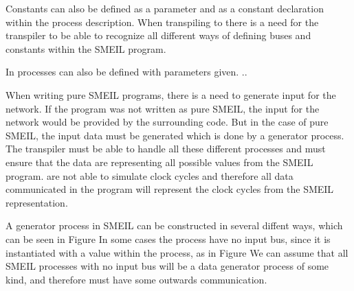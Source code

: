 Constants can also be defined as a parameter and as a constant declaration within the process description. %
When transpiling to \cspm there is a need for the transpiler to be able to recognize all different ways of defining buses and constants within the SMEIL program.


In \cspm{} processes can also be defined with parameters given. .. %



When writing pure SMEIL programs, there is a need to generate input for the network. If the program was not written as pure SMEIL, the input for the network would be provided by the surrounding code. But in the case of pure SMEIL, the input data must be generated which is done by a generator process.
The transpiler must be able to handle all these different processes and must ensure that the data are representing all possible values from the SMEIL program. \cspm are not able to simulate clock cycles and therefore all data communicated in the \cspm program will represent the clock cycles from the SMEIL representation.

A generator process in SMEIL can be constructed in several diffent ways, which can be seen in Figure %
In some cases the process have no input bus, since it is instantiated with a value within the process, as in Figure %
We can assume that all SMEIL processes with no input bus will be a data generator process of some kind, and therefore must have some outwards communication. %

